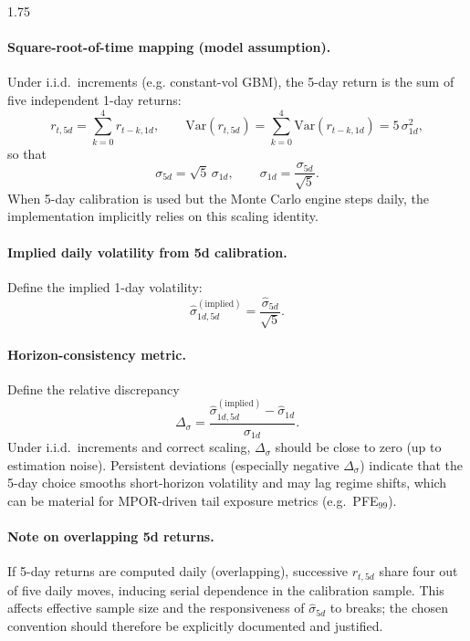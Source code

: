 \begin{spacing}{1.75}
	 \paragraph{Square-root-of-time mapping (model assumption).}
	 Under i.i.d.\ increments (e.g. constant-vol GBM), the 5-day return is the sum of five independent 1-day returns:
	 \begin{equation}
	 	r_{t,5d}=\sum_{k=0}^{4} r_{t-k,1d},
	 	\qquad
	 	\mathrm{Var}(r_{t,5d}) = \sum_{k=0}^{4}\mathrm{Var}(r_{t-k,1d}) = 5\,\sigma^2_{1d},
	 \end{equation}
	 so that
	 \begin{equation}
	 	\sigma_{5d}=\sqrt{5}\,\sigma_{1d},
	 	\qquad
	 	\sigma_{1d}=\frac{\sigma_{5d}}{\sqrt{5}}.
	 \end{equation}
	 When 5-day calibration is used but the Monte Carlo engine steps daily, the implementation implicitly relies on this scaling identity.
	 
	 \paragraph{Implied daily volatility from 5d calibration.}
	 Define the implied 1-day volatility:
	 \begin{equation}
	 	\widehat{\sigma}^{(\mathrm{implied})}_{1d,5d}
	 	=
	 	\frac{\widehat{\sigma}_{5d}}{\sqrt{5}}.
	 \end{equation}
	 
	 \paragraph{Horizon-consistency metric.}
	 Define the relative discrepancy
	 \begin{equation}
	 	\Delta_{\sigma}
	 	=
	 	\frac{\widehat{\sigma}^{(\mathrm{implied})}_{1d,5d}-\widehat{\sigma}_{1d}}{\widehat{\sigma}_{1d}}.
	 \end{equation}
	 Under i.i.d.\ increments and correct scaling, $\Delta_{\sigma}$ should be close to zero (up to estimation noise). Persistent deviations (especially negative $\Delta_{\sigma}$) indicate that the 5-day choice smooths short-horizon volatility and may lag regime shifts, which can be material for MPOR-driven tail exposure metrics (e.g.\ PFE$_{99}$).
	 
	 \paragraph{Note on overlapping 5d returns.}
	 If 5-day returns are computed daily (overlapping), successive $r_{t,5d}$ share four out of five daily moves, inducing serial dependence in the calibration sample. This affects effective sample size and the responsiveness of $\widehat{\sigma}_{5d}$ to breaks; the chosen convention should therefore be explicitly documented and justified.
	 

\end{spacing}
